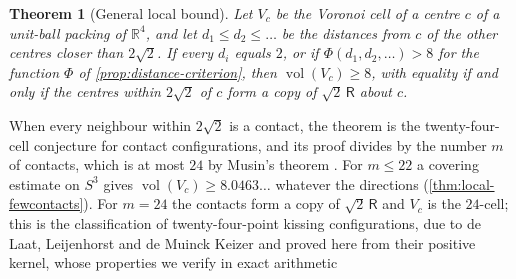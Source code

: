 \documentclass[11pt,reqno]{amsart}
\renewcommand{\_}{\origunderscore\allowbreak}
\numberwithin{equation}{section}
\theoremstyle{plain}
\newtheorem{thm}{Theorem}[section]
\theoremstyle{definition}
\theoremstyle{remark}
\newcommand{\Rt}{\mathsf{R}}                 %
\DeclareMathOperator{\vol}{vol}
\begin{document}
\begin{thm}[General local bound]\label{thm:local-general}
Let $V_c$ be the Voronoi cell of a centre $c$ of a unit-ball packing of
$\mathbb{R}^4$, and let $d_1\le d_2\le\dots$ be the distances from $c$ of
the other centres closer than $2\sqrt2$. If every $d_i$ equals $2$, or if
$\Phi(d_1,d_2,\dots)>8$ for the function $\Phi$ of
\cref{prop:distance-criterion}, then $\vol(V_c)\ge8$, with equality if and
only if the centres within $2\sqrt2$ of $c$ form a copy of $\sqrt2\,\Rt$
about $c$.
\end{thm}

When every neighbour within $2\sqrt2$ is a contact, the theorem is the
twenty-four-cell conjecture for contact configurations, and its proof
divides by the number $m$ of contacts, which is at most $24$ by Musin's
theorem \cite{Mus08}. For $m\le22$ a covering estimate on $S^3$ gives
$\vol(V_c)\ge8.0463\ldots$ whatever the directions
(\cref{thm:local-fewcontacts}). For $m=24$ the contacts form a copy of
$\sqrt2\,\Rt$ and $V_c$ is the $24$-cell; this is the classification of
twenty-four-point kissing configurations, due to de Laat, Leijenhorst and
de Muinck Keizer \cite{LLM24} and proved here from their positive kernel,
whose properties we verify in exact arithmetic
\end{document}
